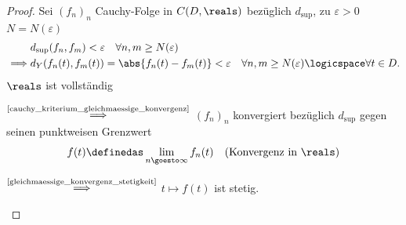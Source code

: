 \begin{proof}
    Sei \( (f_n)_n\) Cauchy-Folge in \( C(D,\reals )\) bezüglich \( d_{\sup}\), \dh zu \( \varepsilon>0 \) \texists \( N=N(\varepsilon)\) \sd
    \begin{align*}
        &d_{\sup}(f_n,f_m)<\varepsilon\quad \forall n,m\geq N(\varepsilon)\\
        \implies &d_Y(f_n(t),f_m(t))=\abs{f_n(t)-f_m(t)}<\varepsilon \quad \forall n,m\geq N(\varepsilon)\logicspace \forall t\in D. 
    \end{align*} 
    \( \reals \) ist vollständig
    \begin{proofdescription}
        \item[\( \overset{\text{\ref{cauchy_kriterium_gleichmaessige_konvergenz}}}{\implies}\)] \( (f_n)_n\) konvergiert bezüglich \( d_{\sup}\) gegen seinen punktweisen Grenzwert
        \begin{align*}
            f(t)\definedas \lim\limits_{n \goesto \infty} f_n(t)\quad (\text{Konvergenz in \( \reals \)})
        \end{align*}   
        \item[\( \overset{\text{\ref{gleichmaessige_konvergenz_stetigkeit}}}{\implies}\)] \( t\mapsto f(t)\) ist stetig. 
    \end{proofdescription}
    
\end{proof}
